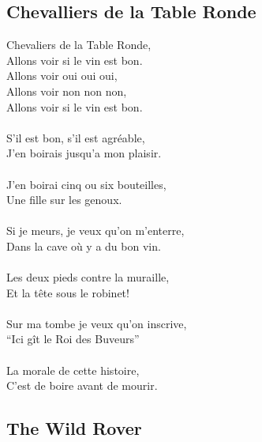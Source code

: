 \documentclass[a5paper]{article}
\begin{document}
\newpage

\subsection{Chevalliers de la Table Ronde} %
\label{sub:chevalliers_de_la_table_ronde}

Chevaliers de la Table Ronde,       \\
Allons voir si le vin est bon.            \\
Allons voir oui oui oui,                   \\
Allons voir non non non, 	            \\
Allons voir si le vin est bon.          \\
\\
S'il est bon, s'il est agr\'{e}able,\\
J'en boirais jusqu'a mon plaisir.\\
\\
J'en boirai cinq ou six bouteilles,\\
Une fille sur les genoux.\\
\\
Si je meurs, je veux qu'on m'enterre,\\
Dans la cave o\`{u} y a du bon vin.\\
\\
Les deux pieds contre la muraille,\\
Et la t\^{e}te sous le robinet!\\
\\
Sur ma tombe je veux qu'on inscrive,\\
``Ici g\^{i}t le Roi des Buveurs''\\
\\
La morale de cette histoire,\\
C'est de boire avant de mourir.  \\


\subsection{The Wild Rover} %
\label{sub:the_wild_rover}
\end{document}
